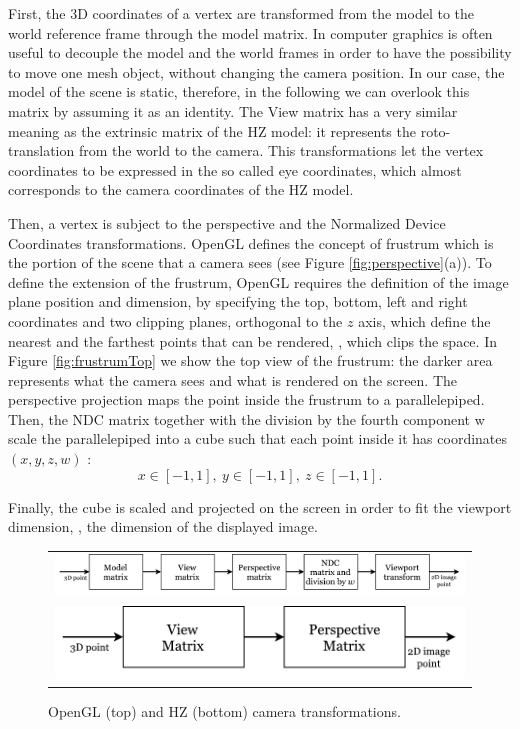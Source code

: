 First, the 3D coordinates of a vertex are transformed from the model to the world reference frame through the model matrix. 
In computer graphics is often useful to decouple the model and the world frames in order to have the possibility to move one mesh object, without changing the camera position. 
In our case, the model of the scene is static, therefore, in the following we can overlook this matrix by assuming it as an identity.
The View matrix has a very similar meaning as the extrinsic matrix of the HZ model: it represents the roto-translation from the world to the camera. This transformations let the vertex coordinates to be expressed in the so called eye coordinates, which almost corresponds to the camera coordinates of the HZ model.

Then, a vertex is subject to the perspective and the Normalized Device Coordinates transformations.
OpenGL defines the concept of frustrum which is the portion of the scene that a camera sees (see Figure \ref{fig:perspective}(a)).
To define the extension of the frustrum, OpenGL requires the definition of the image plane position and dimension, by specifying the top, bottom, left and right coordinates and two clipping planes, orthogonal to the $z$ axis, which define the nearest and the farthest points that can be rendered, \ie, which clips the space. 
In Figure \ref{fig:frustrumTop} we show the top view of the frustrum: the darker area represents what the camera sees and what is rendered on the screen. 
The perspective projection maps the point inside the frustrum to a parallelepiped. 
Then, the NDC matrix together with the division by the fourth component w scale the parallelepiped into a cube such that each point inside it has coordinates $(x,y,z,w)$ :
\begin{equation}
 x \in [-1,1], \:
 y \in [-1,1], \:
 z \in [-1,1] .
\end{equation}

Finally, the cube is scaled and projected on the screen in order to fit the viewport dimension, \ie, the dimension of the displayed image.

\begin{figure}[t]
\centering
 \begin{tabular}{c}
  \includegraphics[height=0.1\columnwidth]{./img/ch-camera/cameraopengl-hz01}\\
  \includegraphics[height=0.1\columnwidth]{./img/ch-camera/cameraopengl-hz02}
 \end{tabular}
 \caption{OpenGL (top) and HZ (bottom) camera transformations.}
 \label{fig:camtrans}
\end{figure}

